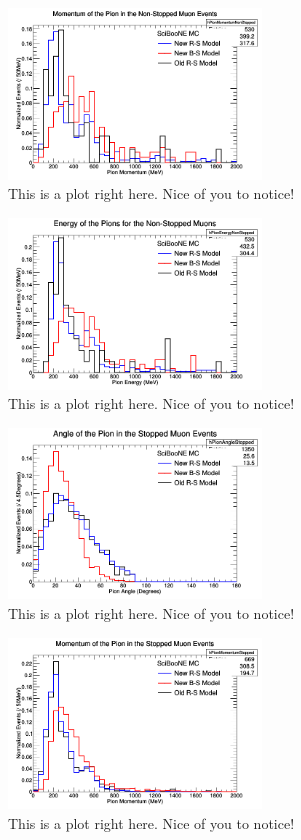 \documentclass[11pt]{article}
\begin{document}
\begin{figure}[H]
\centering
\includegraphics[width=0.6\textwidth]{NMPionPlottingImages/2-NMPionPlotting.png}
\caption{This is a plot right here. Nice of you to notice!}
\end{figure}

\begin{figure}[H]
\centering
\includegraphics[width=0.6\textwidth]{NMPionPlottingImages/3-NMPionPlotting.png}
\caption{This is a plot right here. Nice of you to notice!}
\end{figure}

\begin{figure}[H]
\centering
\includegraphics[width=0.6\textwidth]{NMPionPlottingImages/4-NMPionPlotting.png}
\caption{This is a plot right here. Nice of you to notice!}
\end{figure}

\begin{figure}[H]
\centering
\includegraphics[width=0.6\textwidth]{NMPionPlottingImages/5-NMPionPlotting.png}
\caption{This is a plot right here. Nice of you to notice!}
\end{figure}
\end{document}
